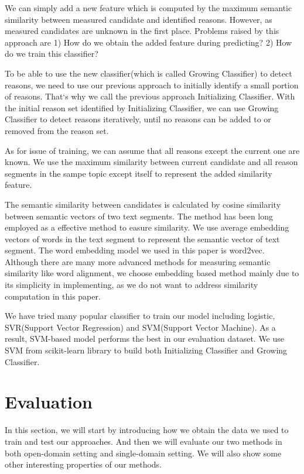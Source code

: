 \documentclass[11pt,a4paper]{article}
\begin{document}
We can simply add a new feature which is computed by the maximum semantic similarity between measured candidate and identified reasons. However, as measured candidates are unknown in the first place. Problems raised by this approach are 1) How do we obtain the added feature during predicting? 2) How do we train this classifier?

To be able to use the new classifier(which is called Growing Classifier) to detect reasons, we need to use our previous approach to initially identify a small portion of reasons. That`s why we call the previous approach Initializing Classifier. With the initial reason set identified by Initializing Classifier, we can use Growing Classifier to detect reasons iteratively, until no reasons can be added to or removed from the reason set.

As for issue of training, we can assume that all reasons except the current one are known. We use the maximum similarity between current candidate and all reason segments in the sampe topic except itself to represent the added similarity feature.

The semantic similarity between candidates is calculated by cosine similarity between semantic vectors of two text segments. The method has been long employed as a effective method to easure similarity\cite{steinbach2000comparison}. We use average embedding vectors of words in the text segment to represent the semantic vector of text segment. The word embedding model we used in this paper is word2vec\cite{mikolov2013efficient}. Although there are many more advanced methods for measuring semantic similarity like word alignment\cite{sultan2015dls}, we choose embedding based method mainly due to its simplicity in implementing, as we do not want to address similarity computation in this paper.

We have tried many popular classifier to train our model including logistic, SVR(Support Vector Regression) and SVM(Support Vector Machine). As a result, SVM-based model performs the best in our evaluation dataset. We use SVM from scikit-learn library to build both Initializing Classifier and Growing Classifier.


\section{Evaluation}
\label{sec:evaluation}

In this section, we will start by introducing how we obtain the data we used to train and test our approaches. And then we will evaluate our two methods in both open-domain setting and single-domain setting. We will also show some other interesting properties of our methods. 
\end{document}
